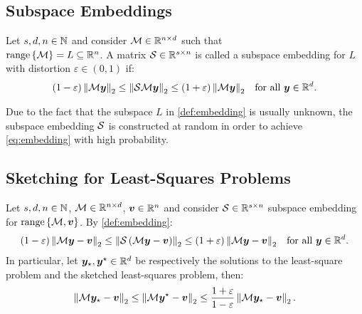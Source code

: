 \subsection{Subspace Embeddings}

\begin{definition} \label{def:embedding}
    Let $s, d, n \in \mathbb{N}$ and consider $\mathcal{M} \in \mathbb{R}^{n \times d}$ such that \\ $\operatorname*{range}\left\{\mathcal{M}\right\} = L \subseteq \mathbb{R}^{n}$. A matrix $\mathcal{S} \in \mathbb{R}^{s \times n}$ is called a subspace embedding for $L$ with distortion $\varepsilon \in \left(0, 1\right)$ if:
    \begin{align}
        \left( 1 - \varepsilon \right) \left\lVert \mathcal{M} \bm{y} \right\rVert_2 \leq \left\lVert \mathcal{S} \mathcal{M} \bm{y} \right\rVert_2 &\leq \left( 1 + \varepsilon \right) \left\lVert \mathcal{M} \bm{y} \right\rVert_2 &\text{for all } \bm{y} \in \mathbb{R}^{d}. \label{eq:embedding}
    \end{align}
\end{definition}

Due to the fact that the subspace $L$ in \cref{def:embedding} is usually unknown, the subspace embedding $\mathcal{S}$ is constructed at random in order to achieve \cref{eq:embedding} with high probability.

\subsection{Sketching for Least-Squares Problems}

\begin{proposition}
    Let $s, d, n \in \mathbb{N}$, $\mathcal{M} \in \mathbb{R}^{n \times d}$, $\bm{v} \in \mathbb{R}^{n}$ and consider $\mathcal{S} \in \mathbb{R}^{s \times n}$ subspace embedding for $\operatorname*{range}\left\{\mathcal{M}, \bm{v}\right\}$. By \cref{def:embedding}:
    \begin{align}
        \left( 1 - \varepsilon \right) \left\lVert \mathcal{M} \bm{y} - \bm{v} \right\rVert_2 \leq \left\lVert \mathcal{S} \left( \mathcal{M} \bm{y} - \bm{v} \right) \right\rVert_2 &\leq \left( 1 + \varepsilon \right) \left\lVert \mathcal{M} \bm{y} - \bm{v} \right\rVert_2 &\text{for all } \bm{y} \in \mathbb{R}^{d}.
    \end{align}
    In particular, let $\bm{y}_{\star}, \bm{y}^{\star} \in \mathbb{R}^{d}$ be respectively the solutions to the least-square problem and the sketched least-squares problem, then:
    \begin{align}
        \left\lVert \mathcal{M} \bm{y}_{\star} - \bm{v} \right\rVert_2 \leq \left\lVert \mathcal{M} \bm{y}^{\star} - \bm{v} \right\rVert_2 \leq \frac{1 + \varepsilon}{1 - \varepsilon} \left\lVert \mathcal{M} \bm{y}_{\star} - \bm{v} \right\rVert_2.
    \end{align}
\end{proposition}

